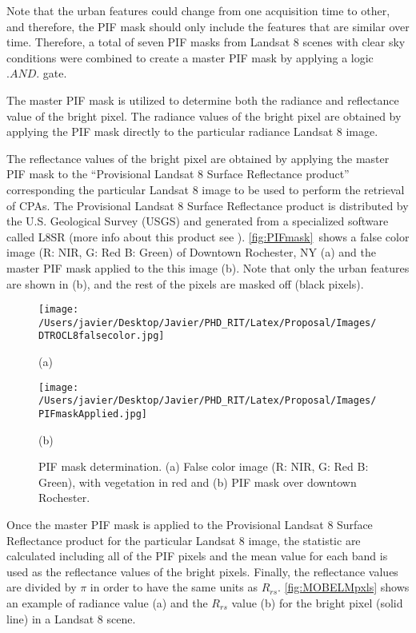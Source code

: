 \documentclass[onecolumn,3p]{elsarticle}
\begin{document}
Note that the urban features could change from one acquisition time to other, and therefore, the PIF mask should only include the features that are similar over time. Therefore, a total of seven PIF masks from Landsat 8 scenes with clear sky conditions were combined to create a master PIF mask by applying a logic $.AND.$ gate.

The master PIF mask is utilized to determine both the radiance and reflectance value of the bright pixel. The radiance values of the bright pixel are obtained by applying the PIF mask directly to the particular radiance Landsat 8 image. 

The reflectance values of the bright pixel are obtained by applying the master PIF mask to the ``Provisional Landsat 8 Surface Reflectance product'' corresponding the particular Landsat 8 image to be used to perform the retrieval of CPAs. The Provisional Landsat 8 Surface Reflectance product is distributed by the U.S. Geological Survey (USGS) and generated from a specialized software called L8SR (more info about this product see \cite{L8SurfProduct2015}). \autoref{fig:PIFmask}~shows a false color image (R: NIR, G: Red B: Green) of Downtown Rochester, NY (a) and the master PIF mask applied to the this image (b). Note that only the urban features are shown in (b), and the rest of the pixels are masked off (black pixels).

\begin{figure}[htb]
  \begin{minipage}[c]{0.48\linewidth}
    \centering
      \texttt{[image: /Users/javier/Desktop/Javier/PHD\_RIT/Latex/Proposal/Images/DTROCL8falsecolor.jpg]}
    \centerline{(a)}\medskip
  \end{minipage}
  \hfill
  \begin{minipage}[d]{0.48\linewidth}
    \centering
      \texttt{[image: /Users/javier/Desktop/Javier/PHD\_RIT/Latex/Proposal/Images/PIFmaskApplied.jpg]}
    \centerline{(b)}\medskip
  \end{minipage}
  \caption{PIF mask determination. (a) False color image (R: NIR, G: Red B: Green), with vegetation in red and (b) PIF mask over downtown Rochester. \label{fig:PIFmask} } 
\end{figure}

Once the master PIF mask is applied to the Provisional Landsat 8 Surface Reflectance product for the particular Landsat 8 image, the statistic are calculated including all of the PIF pixels and the mean value for each band is used as the reflectance values of the bright pixels. Finally, the reflectance values are divided by $\pi$ in order to have the same units as $R_{rs}$. \autoref{fig:MOBELMpxls} shows an example of radiance value (a) and the $R_{rs}$ value (b) for the bright pixel (solid line) in a Landsat 8 scene.
\end{document}
